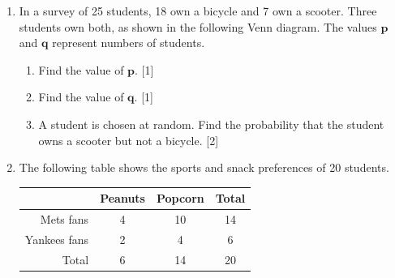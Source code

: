 \documentclass[12pt, twoside]{article}
\begin{document}
\begin{enumerate}[itemsep=0.1cm]

\newpage

\item In a survey of 25 students, 18 own a bicycle and 7 own a scooter.
Three students own both, as shown in the following Venn diagram.
The values $\boldsymbol{p}$ and $\boldsymbol{q}$ represent numbers of students.

\begin{center}
\end{center}

\begin{enumerate}[itemsep=0.25cm]
  \item Find the value of $\boldsymbol{p}$. \hfill [1]
  \item Find the value of $\boldsymbol{q}$. \hfill [1]
  \item A student is chosen at random. Find the probability that the student
        owns a scooter but not a bicycle. \hfill [2]
\end{enumerate}
\vspace{0.2cm}


\newpage
\item The following table shows the sports and snack preferences of 20 students.

\renewcommand{\arraystretch}{1.8}
\begin{center}
\begin{tabular}{r|c|c|c}
    & Peanuts & Popcorn & Total \\
    \hline
    Mets fans    & 4  & 10 & 14 \\
    \hline
    Yankees fans & 2  & 4  & 6  \\
    \hline
    Total        & 6  & 14 & 20 \\
\end{tabular}
\end{center}


\end{enumerate}
\end{document}
